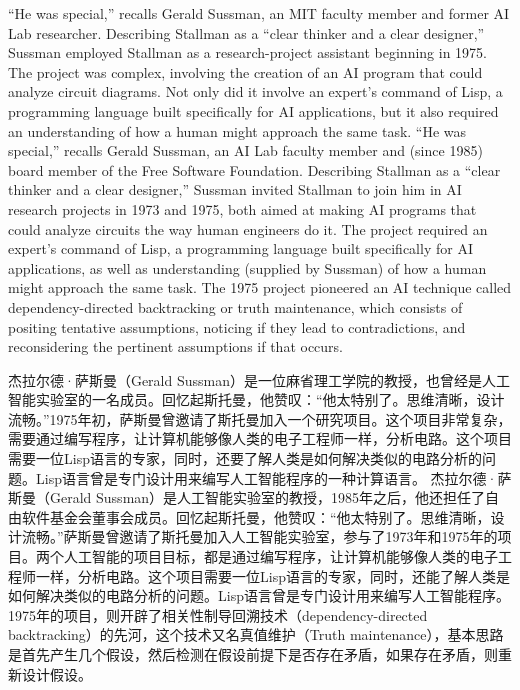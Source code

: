 \ifdefined\eng
\ifdefined\vone
``He was special,'' recalls Gerald Sussman, an MIT faculty member and former AI Lab researcher. Describing Stallman as a ``clear thinker and a clear designer,'' Sussman employed Stallman as a research-project assistant beginning in 1975. The project was complex, involving the creation of an AI program that could analyze circuit diagrams. Not only did it involve an expert's command of Lisp, a programming language built specifically for AI applications, but it also required an understanding of how a human might approach the same task.
\fi
\ifdefined\vtwo
``He was special,'' recalls Gerald Sussman, an AI Lab faculty member and (since 1985) board member of the Free Software Foundation. Describing Stallman as a ``clear thinker and a clear designer,'' Sussman invited Stallman to join him in AI research projects in 1973 and 1975, both aimed at making AI programs that could analyze circuits the way human engineers do it. The project required an expert's command of Lisp, a programming language built specifically for AI applications, as well as understanding (supplied by Sussman) of how a human might approach the same task.  The 1975 project pioneered an AI technique called dependency-directed backtracking or truth maintenance, which consists of positing tentative assumptions, noticing if they lead to contradictions, and reconsidering the pertinent assumptions if that occurs.
\fi
\fi

\ifdefined\chs
\ifdefined\vone
杰拉尔德·萨斯曼（Gerald Sussman）是一位麻省理工学院的教授，也曾经是人工智能实验室的一名成员。回忆起斯托曼，他赞叹：``他太特别了。思维清晰，设计流畅。''1975年初，萨斯曼曾邀请了斯托曼加入一个研究项目。这个项目非常复杂，需要通过编写程序，让计算机能够像人类的电子工程师一样，分析电路。这个项目需要一位Lisp语言的专家，同时，还要了解人类是如何解决类似的电路分析的问题。Lisp语言曾是专门设计用来编写人工智能程序的一种计算语言。
\fi
\ifdefined\vtwo
杰拉尔德·萨斯曼（Gerald Sussman）是人工智能实验室的教授，1985年之后，他还担任了自由软件基金会董事会成员。回忆起斯托曼，他赞叹：``他太特别了。思维清晰，设计流畅。''萨斯曼曾邀请了斯托曼加入人工智能实验室，参与了1973年和1975年的项目。两个人工智能的项目目标，都是通过编写程序，让计算机能够像人类的电子工程师一样，分析电路。这个项目需要一位Lisp语言的专家，同时，还能了解人类是如何解决类似的电路分析的问题。Lisp语言曾是专门设计用来编写人工智能程序。1975年的项目，则开辟了相关性制导回溯技术（dependency-directed backtracking）的先河，这个技术又名真值维护（Truth maintenance），基本思路是首先产生几个假设，然后检测在假设前提下是否存在矛盾，如果存在矛盾，则重新设计假设。
\fi
\fi

